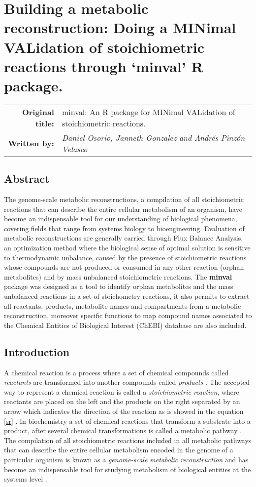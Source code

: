 \chapter{Building a metabolic reconstruction: Doing a MINimal VALidation of stoichiometric reactions through `minval' R package.}
\begin{tabular}{rm{12.5cm}}
\textsf{\textbf{Original title:}}& minval: An R package for MINimal VALidation of stoichiometric \newline reactions.\\
\textsf{\textbf{Written by:}} & \textit{Daniel Osorio, Janneth Gonzalez and Andrés Pinzón-Velasco}\\ 
\end{tabular}
\section*{Abstract}
The genome-scale metabolic reconstructions, a compilation of all stoichiometric reactions that can describe the entire cellular metabolism of an organism, have become an indispensable tool for our understanding of biological phenomena, covering fields that range from systems biology to bioengineering. Evaluation of metabolic reconstructions are generally carried through Flux Balance Analysis, an optimization method where the biological sense of optimal solution is sensitive to thermodynamic unbalance, caused by the presence of stoichiometric reactions whose compounds are not produced or consumed in any other reaction (orphan metabolites) and by mass unbalanced stoichiometric reactions.  The \textbf{minval} package was designed as a tool to identify orphan metabolites and the mass unbalanced reactions in a set of stoichometry reactions, it also permits to extract all reactants, products, metabolite names and compartments from a metabolic reconstruction, moreover specific functions to map compound names associated to the Chemical Entities of Biological Interest (ChEBI) database are also included.
\section{Introduction}
A chemical reaction is a process where a set of chemical compounds called \emph{reactants} are transformed into another compounds called \emph{products} \cite{Chen2013}. The accepted way to represent a chemical reaction is called a \emph{stoichiometric reaction}, where reactants are placed on the left and the products on the right separated by an arrow which indicates the direction of the reaction as is showed in the equation \ref{sr} \cite{Hendrickson1997}. In biochemistry a set of chemical reactions that transform a substrate into a product, after several chemical transformations is called a metabolic pathway \cite{Lambert2011}. The compilation of all stoichiometric reactions included in all metabolic pathways that can describe the entire cellular metabolism encoded in the genome of a particular organism is known as a \emph{genome-scale metabolic reconstruction} \cite{Park2009} and has become an indispensable tool for studying metabolism of biological entities at the systems level \cite{Thiele2010}.\\

